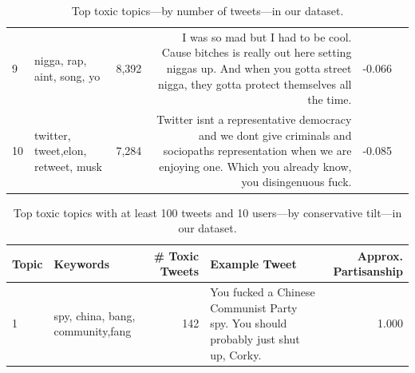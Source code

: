 \begin{table}
\begin{tabularx}{\textwidth}{l|llrXr}
  9 & nigga, rap, aint, song, yo & 8,392 & I was so mad but I had to be cool. Cause bitches is really out here setting niggas up. And when you gotta street nigga, they gotta protect themselves all the time. & -0.066 \\


  10 & twitter, tweet,elon, retweet, musk & 7,284 &Twitter isnt a representative democracy and we dont give criminals and sociopaths representation when we are enjoying one. Which you already know, you disingenuous fuck. & -0.085 \\

\bottomrule
\end{tabularx}
\caption{\label{tab:narratives} Top toxic topics---by number of tweets---in our dataset.} %
\end{table}


\begin{table}
\centering
\scriptsize
\selectfont
\setlength{\tabcolsep}{4pt}
\begin{tabularx}{\textwidth}{l|lrXr}
\toprule
Topic &  {Keywords} & \# Toxic Tweets & Example Tweet  & Approx. Partisanship\\ \midrule
 1& spy, china, bang, community,fang & 142 &You fucked a Chinese Communist Party spy.  You should probably just shut up, Corky.  & 1.000 \\
\bottomrule
\end{tabularx}
\caption{\label{tab:narratives} Top toxic topics  with at least 100 tweets and 10 users---by conservative tilt---in our dataset.} %
\end{table}



